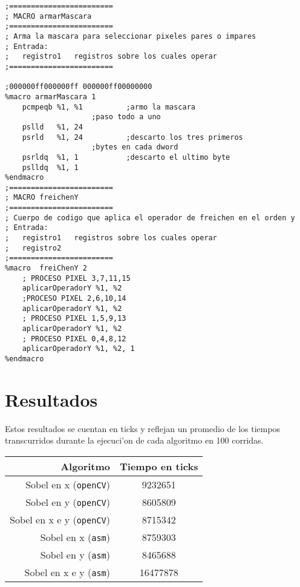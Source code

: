 \documentclass[11pt]{article}
\begin{document}
\begin{enumerate}
\begin{lstlisting}[frame=single]
;========================
; MACRO armarMascara
;========================
; Arma la mascara para seleccionar pixeles pares o impares
; Entrada:
;	registro1	registros sobre los cuales operar 
;========================

;000000ff000000ff 000000ff00000000
%macro armarMascara 1
	pcmpeqb	%1, %1			;armo la mascara
					;paso todo a uno
	pslld	%1, 24
	psrld	%1, 24			;descarto los tres primeros
					;bytes en cada dword
	psrldq	%1, 1			;descarto el ultimo byte
	pslldq	%1, 1
%endmacro
;========================
; MACRO freichenY
;========================
; Cuerpo de codigo que aplica el operador de freichen en el orden y
; Entrada:
;	registro1	registros sobre los cuales operar 
;	registro2
;========================
%macro	freiChenY 2
	; PROCESO PIXEL 3,7,11,15
	aplicarOperadorY %1, %2
	;PROCESO PIXEL 2,6,10,14
	aplicarOperadorY %1, %2
	; PROCESO PIXEL 1,5,9,13
	aplicarOperadorY %1, %2
	; PROCESO PIXEL 0,4,8,12
	aplicarOperadorY %1, %2, 1
%endmacro

\end{lstlisting}
\end{enumerate}


\newpage
\section{Resultados}
Estos resultados se cuentan en ticks y reflejan un promedio de los tiempos transcurridos durante la ejecuci'on de cada algoritmo en 100 corridas.
\begin{center}
 \begin{tabular}{| r | c |}
\hline
Algoritmo	&	Tiempo en ticks \\
\hline
Sobel en x (\verb'openCV')	&	9232651\\
Sobel en y (\verb'openCV')	&	8605809\\
Sobel en x e y (\verb'openCV')	&	8715342\\
\hline
Sobel en x (\verb'asm')	&	8759303\\
Sobel en y (\verb'asm')	&	8465688\\
Sobel en x e y (\verb'asm')	&	16477878\\
\hline
\end{tabular}
\end{center}
\end{document}
